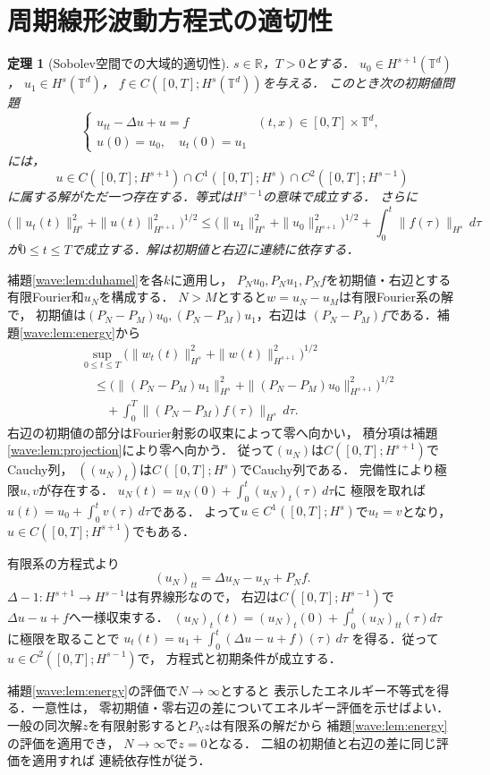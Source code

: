 \documentclass[a5paper,10pt,onecolumn]{jsarticle}
\makeatletter
\theoremstyle{mathnotetheorem}
\newtheorem{theorem}{定理}[section]
\renewcommand{\proofname}{証明}
\renewenvironment{proof}[1][\proofname]{%
  \par\pushQED{\qed}\normalfont\topsep4\p@\@plus2\p@\relax
  \trivlist\item[\hskip\labelsep\bfseries #1]\ignorespaces
}{\popQED\endtrivlist\@endpefalse}
\makeatother
\begin{document}
\section{周期線形波動方程式の適切性}
\begin{theorem}[Sobolev空間での大域的適切性]\label{wave:thm:wellposed}
$s\in\mathbb R$，$T>0$とする．
$u_0\in H^{s+1}(\mathbb T^d)$，
$u_1\in H^s(\mathbb T^d)$，
$f\in C([0,T];H^s(\mathbb T^d))$を与える．
このとき次の初期値問題
\[
 \begin{cases}
 u_{tt}-\Delta u+u=f &(t,x)\in[0,T]\times\mathbb T^d,\\
 u(0)=u_0,\quad u_t(0)=u_1
 \end{cases}
\]
には，
\[
 u\in C([0,T];H^{s+1})\cap C^1([0,T];H^s)
       \cap C^2([0,T];H^{s-1})
\]
に属する解がただ一つ存在する．等式は$H^{s-1}$の意味で成立する．
さらに
\[
 \bigl(\|u_t(t)\|_{H^s}^2+\|u(t)\|_{H^{s+1}}^2\bigr)^{1/2}
 \le
 \bigl(\|u_1\|_{H^s}^2+\|u_0\|_{H^{s+1}}^2\bigr)^{1/2}
 +\int_0^t\|f(\tau)\|_{H^s}\,d\tau
\]
が$0\le t\le T$で成立する．解は初期値と右辺に連続に依存する．
\end{theorem}
\begin{proof}
補題\ref{wave:lem:duhamel}を各$k$に適用し，
$P_Nu_0,P_Nu_1,P_Nf$を初期値・右辺とする
有限Fourier和$u_N$を構成する．
$N>M$とすると$w=u_N-u_M$は有限Fourier系の解で，
初期値は$(P_N-P_M)u_0,(P_N-P_M)u_1$，右辺は
$(P_N-P_M)f$である．補題\ref{wave:lem:energy}から
\[
 \begin{aligned}
 &\sup_{0\le t\le T}
 \bigl(\|w_t(t)\|_{H^s}^2+\|w(t)\|_{H^{s+1}}^2\bigr)^{1/2}\\
 &\quad\le
 \bigl(\|(P_N-P_M)u_1\|_{H^s}^2
 +\|(P_N-P_M)u_0\|_{H^{s+1}}^2\bigr)^{1/2}\\
 &\qquad+\int_0^T\|(P_N-P_M)f(\tau)\|_{H^s}\,d\tau.
 \end{aligned}
\]
右辺の初期値の部分はFourier射影の収束によって零へ向かい，
積分項は補題\ref{wave:lem:projection}により零へ向かう．
従って$(u_N)$は$C([0,T];H^{s+1})$でCauchy列，
$((u_N)_t)$は$C([0,T];H^s)$でCauchy列である．
完備性により極限$u,v$が存在する．
$u_N(t)=u_N(0)+\int_0^t (u_N)_t(\tau)\,d\tau$に
極限を取れば$u(t)=u_0+\int_0^t v(\tau)\,d\tau$である．
よって$u\in C^1([0,T];H^s)$で$u_t=v$となり，
$u\in C([0,T];H^{s+1})$でもある．

有限系の方程式より
\[
 (u_N)_{tt}=\Delta u_N-u_N+P_Nf.
\]
$\Delta-1:H^{s+1}\to H^{s-1}$は有界線形なので，
右辺は$C([0,T];H^{s-1})$で
$\Delta u-u+f$へ一様収束する．
$(u_N)_t(t)=(u_N)_t(0)+\int_0^t(u_N)_{tt}(\tau)d\tau$
に極限を取ることで
$u_t(t)=u_1+\int_0^t(\Delta u-u+f)(\tau)\,d\tau$
を得る．従って$u\in C^2([0,T];H^{s-1})$で，
方程式と初期条件が成立する．

補題\ref{wave:lem:energy}の評価で$N\to\infty$とすると
表示したエネルギー不等式を得る．一意性は，
零初期値・零右辺の差についてエネルギー評価を示せばよい．
一般の同次解$z$を有限射影すると$P_Nz$は有限系の解だから
補題\ref{wave:lem:energy}の評価を適用でき，
$N\to\infty$で$z=0$となる．
二組の初期値と右辺の差に同じ評価を適用すれば
連続依存性が従う．
\end{proof}
\end{document}
